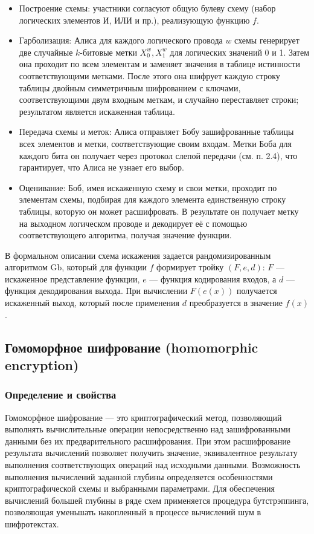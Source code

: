\begin{itemize}
\item Построение схемы: участники согласуют общую булеву схему (набор логических элементов И, ИЛИ и пр.), реализующую функцию \(f\).

\item Гарболизация: Алиса для каждого логического провода \(w\) схемы генерирует две случайные \(k\)-битовые метки \(X^w_0, X^w_1\) для логических значений 0 и 1. Затем она проходит по всем элементам и заменяет значения в таблице истинности соответствующими метками. После этого она шифрует каждую строку таблицы двойным симметричным шифрованием с ключами, соответствующими двум входным меткам, и случайно переставляет строки; результатом является искаженная таблица.

\item Передача схемы и меток: Алиса отправляет Бобу зашифрованные таблицы всех элементов и метки, соответствующие своим входам. Метки Боба для каждого бита он получает через протокол слепой передачи (см. п. 2.4), что гарантирует, что Алиса не узнает его выбор.

\item Оценивание: Боб, имея искаженную схему и свои метки, проходит по элементам схемы, подбирая для каждого элемента единственную строку таблицы, которую он может расшифровать. В результате он получает метку на выходном логическом проводе и декодирует её с помощью соответствующего алгоритма, получая значение функции.
\end{itemize}

В формальном описании схема искажения задается рандомизированным алгоритмом \(\text{Gb}\), который для функции \(f\) формирует тройку \((F,e,d)\): \(F\) --- искаженное представление функции, \(e\) --- функция кодирования входов, а \(d\) --- функция декодирования выхода. При вычислении \(F(e(x))\) получается искаженный выход, который после применения \(d\) преобразуется в значение \(f(x)\).

\subsection{Гомоморфное шифрование (homomorphic encryption)}

\subsubsection{Определение и свойства}

Гомоморфное шифрование --- это криптографический метод, позволяющий выполнять вычислительные операции непосредственно над зашифрованными данными без их предварительного расшифрования. При этом расшифрование результата вычислений позволяет получить значение, эквивалентное результату выполнения соответствующих операций над исходными данными. Возможность выполнения вычислений заданной глубины определяется особенностями криптографической схемы и выбранными параметрами. Для обеспечения вычислений большей глубины в ряде схем применяется процедура бутстрэппинга, позволяющая уменьшать накопленный в процессе вычислений шум в шифротекстах.

